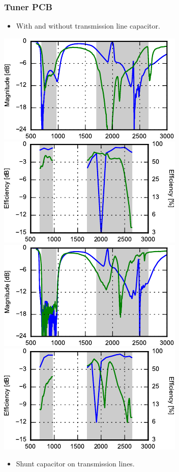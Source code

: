 \begin{frame}
  \frametitle{Tuner PCB}
  \begin{itemize}
  \item With and without transmission line capacitor.
  \end{itemize}
\begin{center}
    \includegraphics{img/Lasse/tuner_pcb/002_s11top.pdf}
    \includegraphics{img/Lasse/tuner_pcb/002_efftop.pdf} \\
    \includegraphics{img/Lasse/tuner_pcb/002_s22side.pdf}
    \includegraphics{img/Lasse/tuner_pcb/002_effside.pdf}
\end{center}
      \begin{itemize}
      \item Shunt capacitor on transmission lines.
      \end{itemize}
\end{frame}

